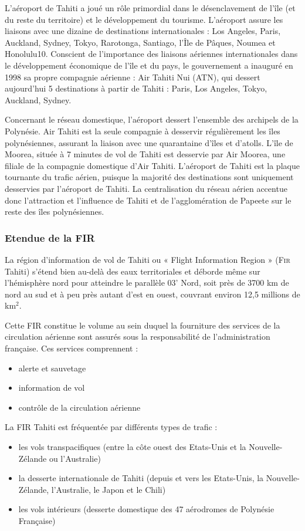 L’aéroport de Tahiti a joué un rôle primordial dans le désenclavement de l’île (et du reste du territoire) et le développement du tourisme. L’aéroport assure les liaisons avec une dizaine de destinations internationales : Los Angeles, Paris, Auckland, Sydney, Tokyo, Rarotonga, Santiago, l’Île de Pâques, Noumea et Honolulu10. Conscient de l’importance des liaisons aériennes internationales dans le développement économique de l’île et du pays, le gouvernement a inauguré en 1998 sa propre compagnie aérienne : Air Tahiti Nui (ATN), qui dessert aujourd’hui 5 destinations à partir de Tahiti : Paris, Los Angeles, Tokyo, Auckland, Sydney.

Concernant le réseau domestique, l’aéroport dessert l’ensemble des archipels de la Polynésie. Air Tahiti est la seule compagnie à desservir régulièrement les îles polynésiennes, assurant la liaison avec une quarantaine d’îles et d’atolls. L’île de Moorea, située à 7 minutes de vol de Tahiti est desservie par Air Moorea, une filiale de la compagnie domestique d’Air Tahiti. L’aéroport de Tahiti est la plaque tournante du trafic aérien, puisque la majorité des destinations sont uniquement desservies par l’aéroport de Tahiti. La centralisation du réseau aérien accentue donc l’attraction et l’influence de Tahiti et de l’agglomération de Papeete sur le reste des îles polynésiennes.

        \subsubsection{Etendue de la \textsc{FIR}\label{Fir}}
La région d'information de vol de Tahiti ou « Flight Information Region » (\textsc{Fir} Tahiti) s'étend bien au-delà des eaux territoriales et déborde même sur l'hémisphère nord pour atteindre le parallèle 03' Nord, soit près de 3700 km de nord au sud et à peu près autant d'est en ouest, couvrant environ 12,5 millions de km$^2$.

Cette FIR constitue le volume au sein duquel la fourniture des services de la circulation aérienne sont assurés sous la responsabilité de l'administration française. Ces services comprennent :
\begin{itemize}
    \item alerte et sauvetage
    \item information de vol
    \item contrôle de la circulation aérienne
\end{itemize}\medskip
La FIR Tahiti est fréquentée par différents types de trafic :
\begin{itemize}
    \item les vols transpacifiques (entre la côte ouest des Etats-Unis et la Nouvelle-Zélande ou l'Australie)
    \item la desserte internationale de Tahiti (depuis et vers les Etats-Unis, la Nouvelle-Zélande, l'Australie, le Japon et le Chili)
    \item les vols intérieurs (desserte domestique des 47 aérodromes de Polynésie Française)
\end{itemize}\medskip

